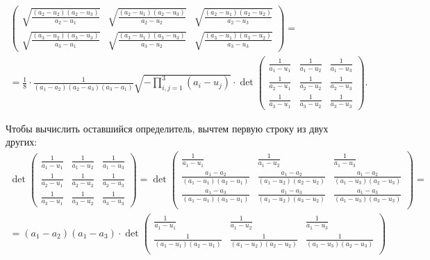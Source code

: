 \begin{solution}
\begin{enumerate}[nolistsep, label=(\arabic*)]
\begin{fullwidth}
\begin{multline*}
\begin{pmatrix}
						\sqrt{\frac{(a_2 - u_2)(a_2 - u_3)}{a_2 - u_1}} & \sqrt{\frac{(a_2 - u_1)(a_2 - u_3)}{a_2 - u_2}} & \sqrt{\frac{(a_2 - u_1)(a_2 - u_2)}{a_2 - u_3}}\\
						\sqrt{\frac{(a_3 - u_2)(a_3 - u_3)}{a_3 - u_1}} & \sqrt{\frac{(a_3 - u_1)(a_3 - u_3)}{a_3 - u_2}} & \sqrt{\frac{(a_3 - u_1)(a_3 - u_2)}{a_3 - u_3}}
					\end{pmatrix} =\\ = \frac{1}{8} \cdot \frac{1}{(a_1 - a_2)(a_2 - a_3)(a_3 - a_1)} \sqrt{-\prod_{i, j = 1}^3(a_i - u_j)} \cdot \det
					\begin{pmatrix}
						\frac{1}{a_1 - u_1} & \frac{1}{a_1 - u_2} & \frac{1}{a_1 - u_3}\\
						\frac{1}{a_2 - u_1} & \frac{1}{a_2 - u_2} & \frac{1}{a_2 - u_3}\\
						\frac{1}{a_3 - u_1} & \frac{1}{a_3 - u_2} & \frac{1}{a_3 - u_3}
					\end{pmatrix}.
				\end{multline*}
			\end{fullwidth}
			 Чтобы вычислить оставшийся определитель, вычтем первую строку из двух других:
			\begin{multline*}
				\det
				\begin{pmatrix}
					\frac{1}{a_1 - u_1} & \frac{1}{a_1 - u_2} & \frac{1}{a_1 - u_3}\\
					\frac{1}{a_2 - u_1} & \frac{1}{a_2 - u_2} & \frac{1}{a_2 - u_3}\\
					\frac{1}{a_3 - u_1} & \frac{1}{a_3 - u_2} & \frac{1}{a_3 - u_3}
				\end{pmatrix} = \det
				\begin{pmatrix}
					\frac{1}{a_1 - u_1} & \frac{1}{a_1 - u_2} & \frac{1}{a_1 - u_3}\\
					\frac{a_1 - a_2}{(a_1 - u_1)(a_2 - u_1)} & \frac{a_1 - a_2}{(a_1 - u_2)(a_2 - u_2)} & \frac{a_1 - a_2}{(a_1 - u_3)(a_2 - u_3)}\\
					\frac{a_1 - a_3}{(a_1 - u_1)(a_3 - u_1)} & \frac{a_1 - a_3}{(a_1 - u_2)(a_3 - u_2)} & \frac{a_1 - a_3}{(a_1 - u_3)(a_3 - u_3)}\\
				\end{pmatrix} = \\ = (a_1 - a_2)(a_1 - a_3) \cdot \det
				\begin{pmatrix}
					\frac{1}{a_1 - u_1} & \frac{1}{a_1 - u_2} & \frac{1}{a_1 - u_3}\\
					\frac{1}{(a_1 - u_1)(a_2 - u_1)} & \frac{1}{(a_1 - u_2)(a_2 - u_2)} & \frac{1}{(a_1 - u_3)(a_2 - u_3)}\\

\end{pmatrix}
\end{multline*}
\end{enumerate}
\end{solution}
